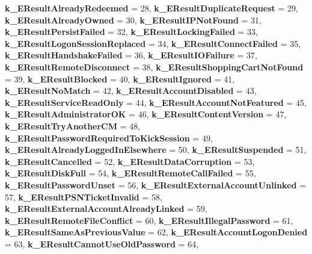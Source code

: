 \begin{DoxyCompactItemize}
{\bfseries k\+\_\+\+E\+Result\+Already\+Redeemed} = 28, 
{\bfseries k\+\_\+\+E\+Result\+Duplicate\+Request} = 29, 
\newline
{\bfseries k\+\_\+\+E\+Result\+Already\+Owned} = 30, 
{\bfseries k\+\_\+\+E\+Result\+I\+P\+Not\+Found} = 31, 
{\bfseries k\+\_\+\+E\+Result\+Persist\+Failed} = 32, 
{\bfseries k\+\_\+\+E\+Result\+Locking\+Failed} = 33, 
\newline
{\bfseries k\+\_\+\+E\+Result\+Logon\+Session\+Replaced} = 34, 
{\bfseries k\+\_\+\+E\+Result\+Connect\+Failed} = 35, 
{\bfseries k\+\_\+\+E\+Result\+Handshake\+Failed} = 36, 
{\bfseries k\+\_\+\+E\+Result\+I\+O\+Failure} = 37, 
\newline
{\bfseries k\+\_\+\+E\+Result\+Remote\+Disconnect} = 38, 
{\bfseries k\+\_\+\+E\+Result\+Shopping\+Cart\+Not\+Found} = 39, 
{\bfseries k\+\_\+\+E\+Result\+Blocked} = 40, 
{\bfseries k\+\_\+\+E\+Result\+Ignored} = 41, 
\newline
{\bfseries k\+\_\+\+E\+Result\+No\+Match} = 42, 
{\bfseries k\+\_\+\+E\+Result\+Account\+Disabled} = 43, 
{\bfseries k\+\_\+\+E\+Result\+Service\+Read\+Only} = 44, 
{\bfseries k\+\_\+\+E\+Result\+Account\+Not\+Featured} = 45, 
\newline
{\bfseries k\+\_\+\+E\+Result\+Administrator\+OK} = 46, 
{\bfseries k\+\_\+\+E\+Result\+Content\+Version} = 47, 
{\bfseries k\+\_\+\+E\+Result\+Try\+Another\+CM} = 48, 
{\bfseries k\+\_\+\+E\+Result\+Password\+Required\+To\+Kick\+Session} = 49, 
\newline
{\bfseries k\+\_\+\+E\+Result\+Already\+Logged\+In\+Elsewhere} = 50, 
{\bfseries k\+\_\+\+E\+Result\+Suspended} = 51, 
{\bfseries k\+\_\+\+E\+Result\+Cancelled} = 52, 
{\bfseries k\+\_\+\+E\+Result\+Data\+Corruption} = 53, 
\newline
{\bfseries k\+\_\+\+E\+Result\+Disk\+Full} = 54, 
{\bfseries k\+\_\+\+E\+Result\+Remote\+Call\+Failed} = 55, 
{\bfseries k\+\_\+\+E\+Result\+Password\+Unset} = 56, 
{\bfseries k\+\_\+\+E\+Result\+External\+Account\+Unlinked} = 57, 
\newline
{\bfseries k\+\_\+\+E\+Result\+P\+S\+N\+Ticket\+Invalid} = 58, 
{\bfseries k\+\_\+\+E\+Result\+External\+Account\+Already\+Linked} = 59, 
{\bfseries k\+\_\+\+E\+Result\+Remote\+File\+Conflict} = 60, 
{\bfseries k\+\_\+\+E\+Result\+Illegal\+Password} = 61, 
\newline
{\bfseries k\+\_\+\+E\+Result\+Same\+As\+Previous\+Value} = 62, 
{\bfseries k\+\_\+\+E\+Result\+Account\+Logon\+Denied} = 63, 
{\bfseries k\+\_\+\+E\+Result\+Cannot\+Use\+Old\+Password} = 64, 

\end{DoxyCompactItemize}
